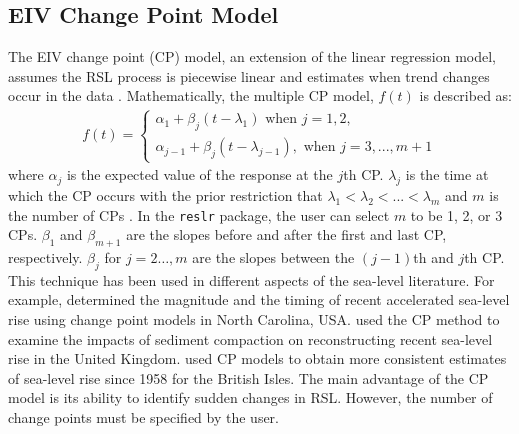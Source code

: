 \subsection{EIV Change Point Model}\label{changepointmodel}
The EIV change point (CP) model, an extension of the linear regression model, assumes the RSL process is piecewise linear and estimates when trend changes occur in the data \citep{Cahill2015_cp}. Mathematically, the multiple CP model, \(f(t)\) is described as:
\begin{align}
     f(t) = 
     \begin{cases}
      \alpha_1 + \beta_j(t - \lambda_1) \text{ when } j = 1,2,\\
      \alpha_{j-1} + \beta_j(t - \lambda_{j-1}),  \text{ when } j = 3,..., m+1
    \end{cases}
 \end{align}
where \(\alpha_j\) is the expected value of the response at the \(j\)th CP. \(\lambda_j\) is the time at which the CP occurs with the prior restriction that \(\lambda_1 < \lambda_2 < ... < \lambda_m\) and \(m\) is the number of CPs \citep{Cahill2015_cp}. In the \texttt{reslr} package, the user can select \(m\) to be 1, 2, or 3 CPs. \(\beta_{1}\) and \(\beta_{m+1}\) are the slopes before and after the first and last CP, respectively. \(\beta_j\) for \(j=2\ldots,m\) are the slopes between the \((j-1)\)th and \(j\)th CP.
This technique has been used in different aspects of the sea-level literature. For example, \citet{Kemp2009} determined the magnitude and the timing of recent accelerated sea-level rise using change point models in North Carolina, USA. \citet{Brain2012} used the CP method to examine the impacts of sediment compaction on reconstructing recent sea-level rise in the United Kingdom. \citet{Hogarth2020} used CP models to obtain more consistent estimates of sea-level rise since 1958 for the British Isles. The main advantage of the CP model is its ability to identify sudden changes in RSL. However, the number of change points must be specified by the user.
